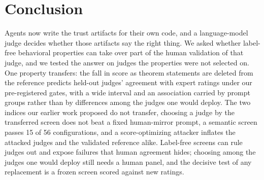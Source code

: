 \section{Conclusion}
Agents now write the trust artifacts for their own code, and a language-model judge decides whether those artifacts say the right thing.
We asked whether label-free behavioral properties can take over part of the human validation of that judge, and we tested the answer on judges the properties were not selected on.
One property transfers: the fall in score as theorem statements are deleted from the reference predicts held-out judges' agreement with expert ratings under our pre-registered gates, with a wide interval and an association carried by prompt groups rather than by differences among the judges one would deploy.
The two indices our earlier work proposed do not transfer, choosing a judge by the transferred screen does not beat a fixed human-mirror prompt, a semantic screen passes 15 of 56 configurations, and a score-optimizing attacker inflates the attacked judges and the validated reference alike.
Label-free screens can rule judges out and expose failures that human agreement hides; choosing among the judges one would deploy still needs a human panel, and the decisive test of any replacement is a frozen screen scored against new ratings.
